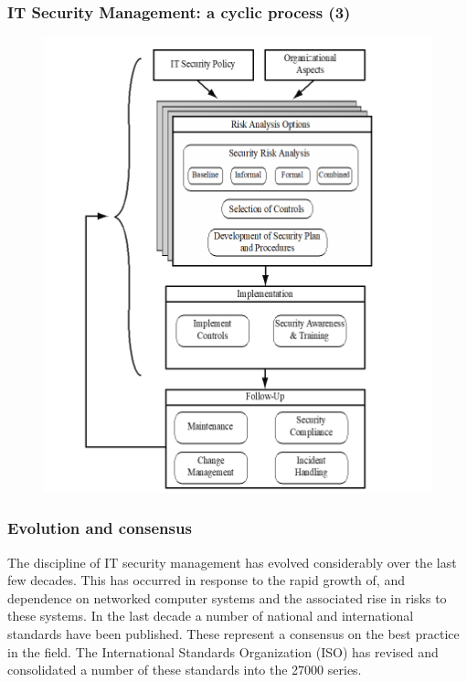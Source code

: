 \documentclass[xcolor ={table,usenames,dvipsnames}]{beamer}
\theoremstyle{definition}
\begin{document}
	\begin{frame}
		\frametitle{IT Security Management: a cyclic process (3)}
			\begin{figure}[h!]
			\centering
			\includegraphics[scale=0.40]{img/img_03.PNG}
			\label{Interfacce di un CS}
		\end{figure}
	\end{frame}
	
	\begin{frame}
		\frametitle{Evolution and consensus}
		The discipline of IT security management has evolved considerably over the last few decades. This has occurred in response to the rapid growth of, and dependence on networked computer systems and the associated rise in risks to these systems. In the last	decade a number of national and international standards have been published. These represent a consensus on the best practice in the field. The International Standards Organization (ISO) has revised and consolidated a number of these standards into the 27000 series.
	\end{frame}
\end{document}
